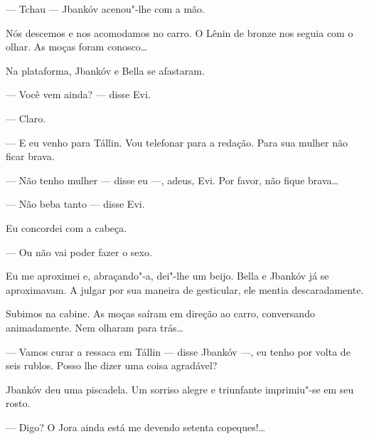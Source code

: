 --- Tchau --- Jbankóv acenou"-lhe com a mão.

Nós descemos e nos acomodamos no carro. O Lênin de bronze nos seguia com
o olhar. As moças foram conosco\ldots{}

Na plataforma, Jbankóv e Bella se afastaram.

--- Você vem ainda? --- disse Evi.

--- Claro.

--- E eu venho para Tállin. Vou telefonar para a redação. Para
sua mulher não ficar brava.

--- Não tenho mulher --- disse eu ---, adeus, Evi.
Por favor, não fique brava\ldots{}

--- Não beba tanto --- disse Evi.

Eu concordei com a cabeça.

--- Ou não vai poder fazer o sexo.

Eu me aproximei e, abraçando"-a, dei"-lhe um beijo. Bella e Jbankóv já se
aproximavam. A julgar por sua maneira de gesticular, ele mentia
descaradamente.

Subimos na cabine. As moças saíram em direção ao carro, conversando
animadamente. Nem olharam para trás\ldots{}

--- Vamos curar a ressaca em Tállin --- disse Jbankóv
---, eu tenho por volta de seis rublos. Posso lhe dizer uma coisa
agradável?

Jbankóv deu uma piscadela. Um sorriso alegre e triunfante imprimiu"-se em
seu rosto.

--- Digo? O Jora ainda está me devendo setenta copeques!\ldots{}

\clearpage
\thispagestyle{empty}

\movetooddpage
\begin{center}
{}
\end{center}

